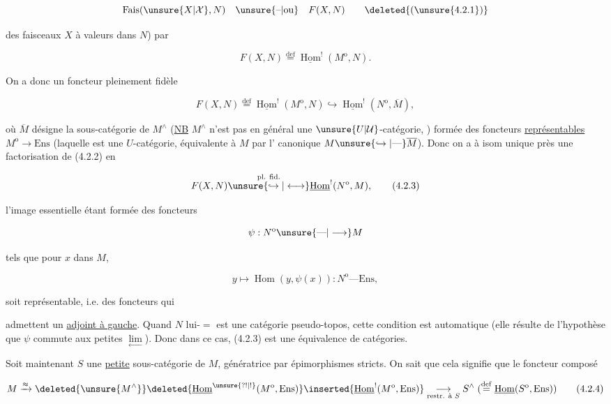 \[
\operatorname{Fais}(\unsure{X|\mathcal X},N)\quad\unsure{\text{--}|\text{ou}}\quad F(X,N)
\tag*{\deleted{(\unsure{4.2.1})}}
\]

des faisceaux  $X$ à valeurs dans $N$) par

\[
F(X,N)\overset{\mathrm{def}}{=}\underline{\operatorname{Hom}}^{!}(M^{\mathrm{o}},N).
\tag*{(4.2.1)}
\]

On a donc un foncteur pleinement fidèle

\[
F(X,N)\overset{\mathrm{def}}{=}\underline{\operatorname{Hom}}^{!}(M^{\mathrm{o}},N)
\hookrightarrow\underline{\operatorname{Hom}}^{!}(N^{\mathrm{o}},\overline M),
\tag*{(4.2.2)}
\]

où $\overline M$ désigne la sous-catégorie de $M^{\wedge}$ (\uline{NB} $M^{\wedge}$ n'est pas en général une $\unsure{U|\mathcal U}$-catégorie, ) formée des foncteurs \uline{représentables}  $M^{\mathrm{o}}\to\mathrm{Ens}$ (laquelle est une $U$-catégorie, équivalente à $M$ par l' canonique $M\unsure{\hookrightarrow|\text{---}}\overline M$). Donc on a à isom unique près une factorisation de (4.2.2) en

\[
F(X,N)\overset{\text{pl. fid.}}{\unsure{\hookrightarrow|\longleftrightarrow}}
\underline{\operatorname{Hom}}^{!}(N^{\mathrm{o}},M),
\tag*{(4.2.3)}
\]

l'image essentielle étant formée des foncteurs

\[
\psi:N^{\mathrm{o}}\unsure{\text{---}|\longrightarrow}M
\]

tels que pour  $x$ dans $M$,

\[
y\longmapsto\operatorname{Hom}(y,\psi(x)):N^{\mathrm{o}}\text{---}\mathrm{Ens},
\]

soit représentable, i.e. des foncteurs qui

admettent un \uline{adjoint à gauche}. Quand $N$ lui-$=$ est une catégorie pseudo-topos, cette condition est automatique (elle résulte de l'hypothèse que $\psi$ commute aux petites $\underset{\longleftarrow}{\lim}$). Donc dans ce cas, (4.2.3) est une équivalence de catégories.

Soit maintenant $S$  une \uline{petite} sous-catégorie de $M$, génératrice par épimorphismes stricts. On sait que cela signifie que le foncteur composé

\[
M\xrightarrow{\approx}
\deleted{\unsure{M^{\wedge}}}
\deleted{\underline{\operatorname{Hom}}^{\unsure{? !|!}}(M^{\mathrm{o}},\mathrm{Ens})}
\inserted{\underline{\operatorname{Hom}}^{!}(M^{\mathrm{o}},\mathrm{Ens})}
\underset{\text{restr. à }S}{\longrightarrow}
S^{\wedge}\;(\overset{\mathrm{def}}{=}\underline{\operatorname{Hom}}(S^{\mathrm{o}},\mathrm{Ens}))
\tag*{(4.2.4)}
\]

